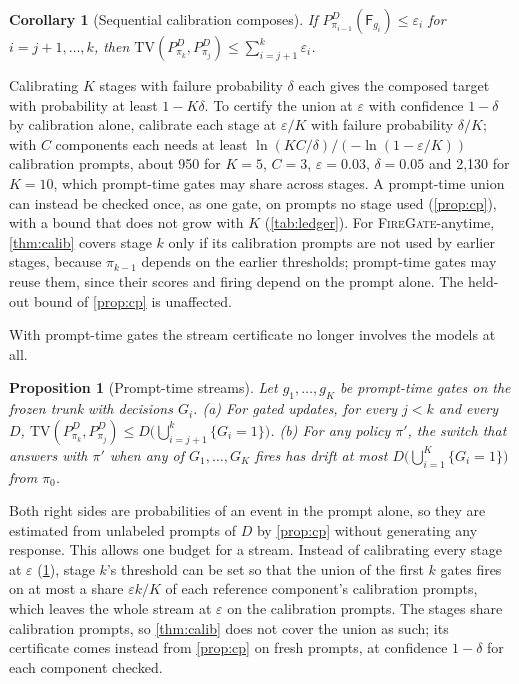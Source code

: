 \documentclass{article}
\theoremstyle{plain}
\newtheorem{proposition}[theorem]{Proposition}
\newtheorem{corollary}[theorem]{Corollary}
\theoremstyle{definition}
\theoremstyle{remark}
\newcommand{\TV}{\mathrm{TV}}
\newcommand{\Fire}{\mathsf{F}}
\newcommand{\methoda}{\textsc{FireGate}-anytime}
\begin{document}
\begin{corollary}[Sequential calibration composes]
\label{cor:compose}
If $P^D_{\pi_{i-1}}(\Fire_{g_i})\le\varepsilon_i$ for $i=j+1,\dots,k$, then
$\TV(P^D_{\pi_k},P^D_{\pi_j})\le\sum_{i=j+1}^k\varepsilon_i$.
\end{corollary}

Calibrating $K$ stages with failure probability $\delta$ each gives the composed target with probability at least $1-K\delta$. To
certify the union at $\varepsilon$ with confidence $1-\delta$ by calibration alone, calibrate each stage at $\varepsilon/K$ with
failure probability $\delta/K$; with $C$ components each needs at least $\ln(KC/\delta)/(-\ln(1-\varepsilon/K))$ calibration
prompts, about 950 for $K=5$, $C=3$, $\varepsilon=0.03$, $\delta=0.05$ and 2{,}130 for $K=10$, which prompt-time gates may share
across stages. A prompt-time union can instead be checked once, as one gate, on prompts no stage used (\cref{prop:cp}),
with a bound that does not grow with $K$ (\cref{tab:ledger}). For
\methoda{}, \cref{thm:calib} covers stage $k$ only if its calibration prompts are not used by earlier stages, because
$\pi_{k-1}$ depends on the earlier thresholds; prompt-time gates may reuse them, since their scores and firing depend on
the prompt alone. The held-out bound of \cref{prop:cp} is unaffected.

With prompt-time gates the stream certificate no longer involves the models at all.

\begin{proposition}[Prompt-time streams]
\label{prop:promptstream}
Let $g_1,\dots,g_K$ be prompt-time gates on the frozen trunk with decisions $G_i$. (a) For gated updates, for
every $j<k$ and every $D$, $\TV(P^D_{\pi_k},P^D_{\pi_j})\le D\big(\bigcup_{i=j+1}^{k}\{G_i=1\}\big)$. (b) For any
policy $\pi'$, the switch that answers with $\pi'$ when any of $G_1,\dots,G_K$ fires has drift at most
$D\big(\bigcup_{i=1}^{K}\{G_i=1\}\big)$ from $\pi_0$.
\end{proposition}

Both right sides are probabilities of an event in the prompt alone, so they are estimated from unlabeled prompts of
$D$ by \cref{prop:cp} without generating any response. This allows one budget for a stream. Instead of calibrating every stage at $\varepsilon$ (\cref{cor:compose}), stage $k$'s
threshold can be set so that the union of the first $k$ gates fires on at most a share $\varepsilon k/K$ of each
reference component's calibration prompts, which leaves the whole stream at $\varepsilon$ on the calibration prompts. The stages share
calibration prompts, so \cref{thm:calib} does not cover the union as such; its certificate comes instead from
\cref{prop:cp} on fresh prompts, at confidence $1-\delta$ for each component checked.
\end{document}
